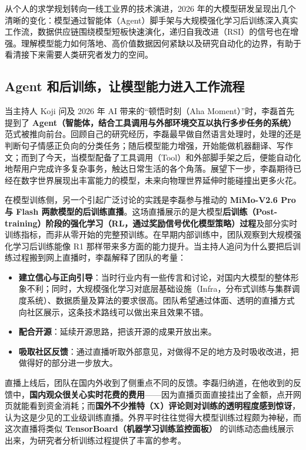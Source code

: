 \documentclass[UTF8,a4paper,11pt,fontset=fandol]{ctexart}
\begin{document}
从个人的求学规划转向一线工业界的技术演进，2026 年的大模型研发呈现出几个清晰的变化：模型通过智能体（Agent）脚手架与大规模强化学习后训练深入真实工作流，数据供应链围绕模型短板快速演化，递归自我改进（RSI）的信号也在增强。理解模型能力如何落地、高价值数据因何紧缺以及研究自动化的边界，有助于看清接下来需要人类研究者发力的空间。
\subsection{Agent 和后训练，让模型能力进入工作流程}
当主持人 Koji 问及 2026 年 AI 带来的“顿悟时刻（Aha Moment）”时，李磊首先提到了 \textbf{Agent（智能体，结合工具调用与外部环境交互以执行多步任务的系统）} 范式被推向前台。回顾自己的研究经历，李磊最早做自然语言处理时，处理的还是判断句子情感正负向的分类任务；随后模型能力增强，开始能做机器翻译、写作文；而到了今天，当模型配备了工具调用（Tool）和外部脚手架之后，便能自动化地帮用户完成许多复杂事务，触达日常生活的各个角落。展望下一步，李磊期待已经在数字世界展现出丰富能力的模型，未来向物理世界延伸时能碰撞出更多火花。

在模型训练侧，另一个引起广泛讨论的实践是李磊参与推动的 \textbf{MiMo-V2.6 Pro 与 Flash 两款模型的后训练直播}。这场直播展示的是大模型\textbf{后训练（Post-training）阶段的强化学习（RL，通过奖励信号优化模型策略）过程}及部分实时训练指标，而非从零开始的完整预训练。在早期内部训练中，团队观察到大规模强化学习后训练能像 R1 那样带来多方面的能力提升。当主持人追问为什么要把后训练过程搬到网上直播时，李磊解释了团队的考量：
\begin{itemize}
\item \textbf{建立信心与正向引导}：当时行业内有一些传言和讨论，对国内大模型的整体形象不利；同时，大规模强化学习对底层基础设施（Infra，分布式训练与集群调度系统）、数据质量及算法的要求很高。团队希望通过体面、透明的直播方式向社区展示，这条技术路线可以做出来且效果不错。
\item \textbf{配合开源}：延续开源思路，把该开源的成果开放出来。
\item \textbf{吸取社区反馈}：通过直播听取外部意见，对做得不足的地方及时吸收改进，把做得好的部分进一步放大。
\end{itemize}

直播上线后，团队在国内外收到了侧重点不同的反馈。李磊归纳道，在他收到的反馈中，\textbf{国内观众很关心实时花费的费用}——因为直播页面直接挂出了金额，点开网页就能看到资金消耗；而\textbf{国外不少推特（X）评论则对训练的透明程度感到惊讶}，认为这是少见的工业级训练直播。外界平时往往觉得大模型训练过程颇为神秘，而这次直播将类似 \textbf{TensorBoard（机器学习训练监控面板）} 的训练动态曲线展示出来，为研究者分析训练过程提供了丰富的参考。
\end{document}
